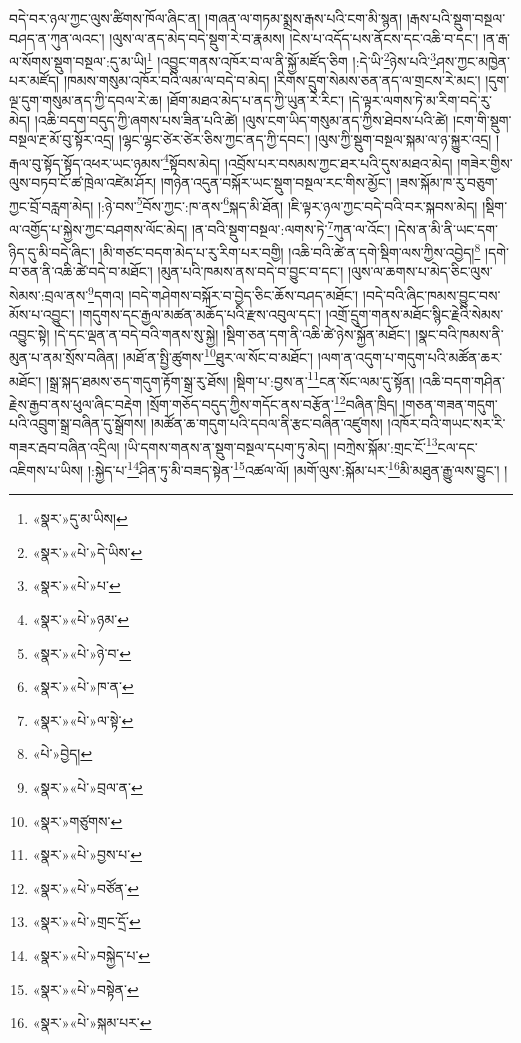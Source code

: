 བདེ་བར་ཉལ་ཀྱང་ལུས་ཚིགས་ཁོལ་ཞིང་ན། །གཞན་ལ་གཏམ་སྨྲས་རྒས་པའི་ངག་མི་སྙན། །རྒས་པའི་སྡུག་བསྔལ་བཤད་ན་ཀུན་ལའང་། །ལུས་ལ་ནད་མེད་བདེ་སྡུག་རེ་བ་རྣམས། །ངེས་པ་འདོད་པས་ནོངས་དང་འཆི་བ་དང་། །ན་རྒ་ལ་སོགས་སྡུག་བསྔལ་:དུ་མ་ཡི།\footnote{«སྣར་»དུ་མ་ཡིས།} །འབྱུང་གནས་འཁོར་བ་ལ་ནི་སྐྱོ་མཛོད་ཅིག །:དེ་ཡི་\footnote{«སྣར་»«པེ་»དེ་ཡིས་}ཉེས་པའི་\footnote{«སྣར་»«པེ་»པ་}ཤས་ཀྱང་མཁྱེན་པར་མཛོད། །ཁམས་གསུམ་འཁོར་བའི་ལམ་ལ་བདེ་བ་མེད། །རིགས་དྲུག་སེམས་ཅན་ནད་ལ་གྲངས་རེ་མང་། །དུག་ལྔ་དུག་གསུམ་ནད་ཀྱི་དབལ་རེ་ཆ། །ཐོག་མཐའ་མེད་པ་ནད་ཀྱི་ཡུན་རེ་རིང་། །དེ་ལྟར་ལགས་ཏེ་མ་རིག་བདེ་རུ་མེད། །འཆི་བདག་བདུད་ཀྱི་ཞགས་པས་ཟིན་པའི་ཚེ། །ལུས་ངག་ཡིད་གསུམ་ནད་ཀྱིས་ཐེབས་པའི་ཚེ། །ངག་གི་སྡུག་བསྔལ་རྔ་མོ་བུ་སྟོར་འདྲ། །ལྷང་ལྷང་ཙེར་ཙེར་ཅིས་ཀྱང་ནད་ཀྱི་དབང་། །ལུས་ཀྱི་སྡུག་བསྔལ་སྐམ་ལ་ཉ་སྐྱུར་འདྲ། །རྒལ་བུ་སྟོད་སྟོད་འཕར་ཡང་ཉམས་\footnote{«སྣར་»«པེ་»ཉམ་}སྟོབས་མེད། །འབྲོས་པར་བསམས་ཀྱང་ཐར་པའི་དུས་མཐའ་མེད། །གཟེར་གྱིས་ལུས་བཏབ་ངོ་ཚ་ཁྲེལ་འཛེམ་ཤོར། །གཉེན་འདུན་བསྐོར་ཡང་སྡུག་བསྔལ་རང་གིས་མྱོང་། །ཟས་སྐོམ་ཁ་རུ་བཅུག་ཀྱང་བྲོ་བརླག་མེད། །:ཉེ་བས་\footnote{«སྣར་»«པེ་»ཉེ་བ་}བོས་ཀྱང་:ཁ་ནས་\footnote{«སྣར་»«པེ་»ཁ་ན་}སྐད་མི་ཐོན། །ཇི་ལྟར་ཉལ་ཀྱང་བདེ་བའི་བར་སྐབས་མེད། །སྡིག་ལ་འགྱོད་པ་སྐྱེས་ཀྱང་བཤགས་ལོང་མེད། །ན་བའི་སྡུག་བསྔལ་:ལགས་ཏེ་\footnote{«སྣར་»«པེ་»ལ་སྟེ་}ཀུན་ལ་འོང་། །དེས་ན་མི་ནི་ཡང་དག་ཉིད་དུ་མི་བདེ་ཞིང་། །མི་གཙང་བདག་མེད་པ་རུ་རིག་པར་བགྱི། །འཆི་བའི་ཚེ་ན་དགེ་སྡིག་ལས་ཀྱིས་འབྱེད།\footnote{«པེ་»བྱེད།} །དགེ་བ་ཅན་ནི་འཆི་ཚེ་བདེ་བ་མཐོང་། །མུན་པའི་ཁམས་ནས་བདེ་བ་བྱུང་བ་དང་། །ལུས་ལ་ཆགས་པ་མེད་ཅིང་ལུས་སེམས་:བྲལ་ནས་\footnote{«སྣར་»«པེ་»བྲལ་ན་}དགའ། །བདེ་གཤེགས་བསྐོར་བ་བྱེད་ཅིང་ཆོས་བཤད་མཐོང་། །བདེ་བའི་ཞིང་ཁམས་བྱུང་བས་མོས་པ་འབྱུང་། །གདུགས་དང་རྒྱལ་མཚན་མཆོད་པའི་རྫས་འབུལ་དང་། །འགྲོ་དྲུག་གནས་མཐོང་སྙིང་རྗེའི་སེམས་འབྱུང་སྟེ། །དེ་དང་ལྡན་ན་བདེ་བའི་གནས་སུ་སྐྱེ། །སྡིག་ཅན་དག་ནི་འཆི་ཚེ་ཉེས་སྐྱོན་མཐོང་། །སྣང་བའི་ཁམས་ནི་མུན་པ་ནམ་སྲོས་བཞིན། །མཐོ་ན་སྤྱི་ཚུགས་\footnote{«སྣར་»གཙུགས་}ཐུར་ལ་སོང་བ་མཐོང་། །ལག་ན་འདུག་པ་གདུག་པའི་མཚོན་ཆར་མཐོང་། །སྒྲ་སྐད་ཐམས་ཅད་གདུག་རྟོག་སྒྲ་རུ་ཐོས། །སྡིག་པ་:བྱས་ན་\footnote{«སྣར་»«པེ་»བྱས་པ་}ངན་སོང་ལམ་དུ་སྟོན། །འཆི་བདག་གཤིན་རྗེས་རྒྱབ་ནས་ཕུལ་ཞིང་བརྡེག །སྲོག་གཅོད་བདུད་ཀྱིས་གདོང་ནས་བརྩོན་\footnote{«སྣར་»«པེ་»བཙོན་}བཞིན་ཁྲིད། །གཅན་གཟན་གདུག་པའི་འབྲུག་སྒྲ་བཞིན་དུ་སྒྲོགས། །མཚོན་ཆ་གདུག་པའི་དབལ་ནི་རྩང་བཞིན་འཛུགས། །འཁོར་བའི་གཡང་སར་རི་གཟར་རྦབ་བཞིན་འདྲིལ། །ཡི་དགས་གནས་ན་སྡུག་བསྔལ་དཔག་ཏུ་མེད། །བཀྲེས་སྐོམ་:གྲང་ངོ་\footnote{«སྣར་»«པེ་»གྲང་དྲོ་}ངལ་དང་འཇིགས་པ་ཡིས། །:སྐྱེད་པ་\footnote{«སྣར་»«པེ་»བསྐྱེད་པ་}ཤིན་ཏུ་མི་བཟད་སྟེན་\footnote{«སྣར་»«པེ་»བསྟེན་}འཚལ་ལོ། །མགོ་ལུས་:སྐོམ་པར་\footnote{«སྣར་»«པེ་»སྐམ་པར་}མི་མཐུན་རྒྱུ་ལས་བྱུང་། །
